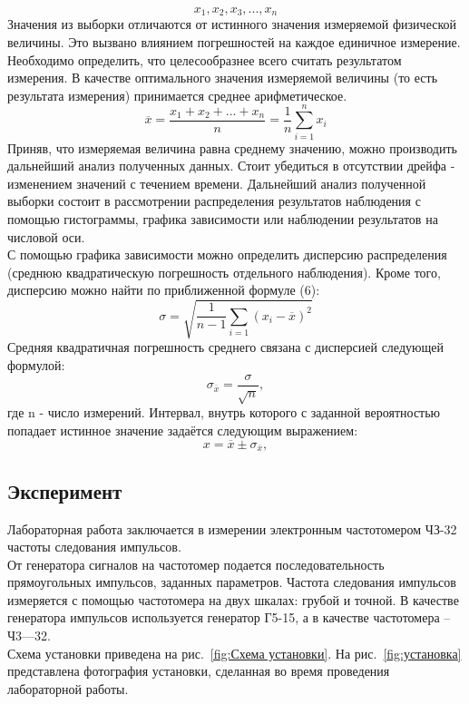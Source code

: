 \begin{equation}
    x_1,x_2,x_3, ..., x_n
\end{equation}
Значения из выборки отличаются от истинного значения измеряемой физической величины. Это вызвано влиянием погрешностей на каждое единичное измерение.\\
Необходимо определить, что целесообразнее всего считать результатом измерения. В качестве оптимального значения измеряемой величины (то есть результата измерения) принимается среднее арифметическое.
\begin{equation}
    \overline{x}=\frac{x_1+x_2+...+x_n}{n}=\frac{1}{n}\sum_{i=1}^{n} x_i
\end{equation}
Приняв, что измеряемая величина равна среднему значению, можно производить дальнейший анализ полученных данных. Стоит убедиться в отсутствии дрейфа - изменением значений с течением времени.
Дальнейший анализ полученной выборки состоит в рассмотрении распределения результатов наблюдения с помощью гистограммы, графика зависимости или наблюдении результатов на числовой оси.\\
С помощью графика зависимости можно определить дисперсию распределения (среднюю квадратическую погрешность отдельного наблюдения). Кроме того, дисперсию можно найти по приближенной формуле (6):
\begin{equation}
    \sigma=\sqrt{\frac{1}{n-1}\sum_{i=1} (x_i-\overline{x})^2}
\end{equation}
Средняя квадратичная погрешность среднего связана с дисперсией следующей формулой:
\begin{equation}
    \sigma_{\overline{x}}=\frac{\sigma}{\sqrt{n}} ,
\end{equation}
где n - число измерений.
Интервал, внутрь которого с заданной вероятностью попадает истинное значение задаётся следующим выражением:
\begin{equation}
    x=\overline{x}\pm\sigma_{\overline{x}} ,
\end{equation}


\subsection{Эксперимент}
Лабораторная работа заключается в измерении  электронным частотомером ЧЗ-32 частоты следования импульсов.\\ От генератора сигналов на частотомер подается последовательность
прямоугольных импульсов, заданных параметров. Частота следования импульсов измеряется с помощью частотомера на двух
шкалах: грубой и точной. В качестве генератора импульсов используется
генератор Г5-15, а в качестве частотомера – Ч3—32.\\
Схема установки приведена на рис.~\ref{fig:Схема установки}. На рис.~\ref{fig:установка} представлена фотография установки, сделанная во время проведения лабораторной работы.

